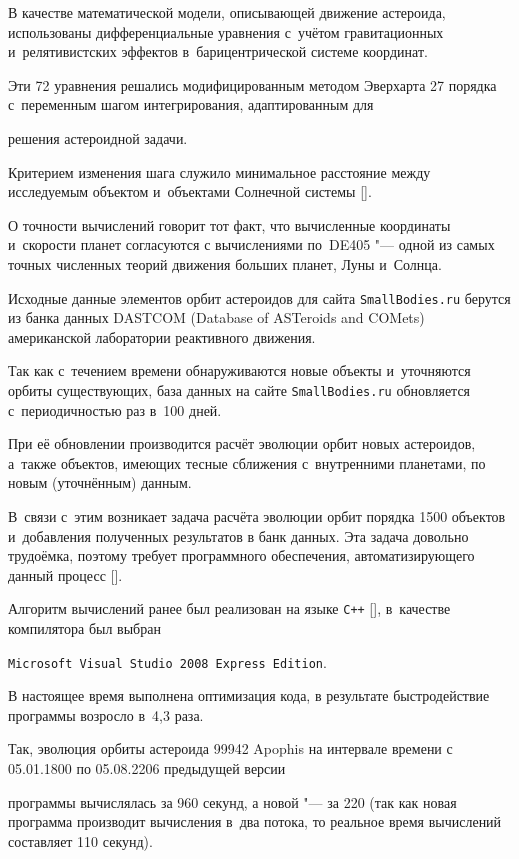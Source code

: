 В качестве математической модели, описывающей движение астероида, использованы дифференциальные уравнения с~учётом гравитационных и~релятивистских эффектов в~барицентрической системе координат. 

Эти 72 уравнения решались модифицированным методом Эверхарта 27 порядка с~переменным шагом интегрирования, адаптированным для

решения астероидной задачи. 

Критерием изменения шага служило минимальное расстояние между исследуемым объектом и~объектами Солнечной системы []. 

О точности вычислений говорит тот факт, что вычисленные координаты и~скорости планет согласуются с вычислениями по~DE405 "--- одной из самых точных численных теорий движения больших планет, Луны и~Солнца.



Исходные данные элементов орбит астероидов для сайта {\tt SmallBodies.ru} берутся из банка данных DASTCOM (Database of ASTeroids and COMets) американской лаборатории реактивного движения. 

Так как с~течением времени обнаруживаются новые объекты и~уточняются орбиты существующих, база данных на сайте {\tt SmallBodies.ru}  обновляется с~периодичностью раз в~100 дней. 

При её обновлении производится расчёт эволюции орбит новых астероидов, а~также объектов, имеющих тесные сближения с~внутренними планетами, по новым (уточнённым) данным. 

В~связи с~этим возникает задача расчёта эволюции орбит порядка 1500 объектов и~добавления полученных результатов в банк данных. Эта задача довольно трудоёмка, поэтому требует программного обеспечения, автоматизирующего данный процесс [].



Алгоритм вычислений ранее был реализован на языке {\tt C++} [], в~качестве компилятора был выбран

{\tt Microsoft Visual Studio 2008 Express Edition}.

В настоящее время выполнена оптимизация кода, в результате быстродействие программы возросло в~4,3 раза. 

Так, эволюция орбиты астероида 99942 Apophis на интервале времени с 05.01.1800 по 05.08.2206 предыдущей версии

программы вычислялась за 960 секунд, а новой "--- за 220 (так как новая программа производит вычисления в~два потока, то реальное время вычислений составляет 110 секунд).



